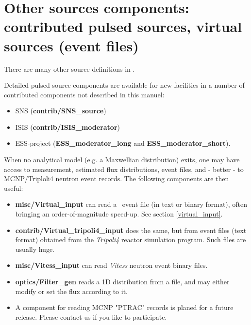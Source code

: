 \newpage


\newpage


\newpage


\newpage


\newpage


\newpage


\newpage


\newpage


\newpage
\section{Other sources components: contributed pulsed sources, virtual sources (event files)}
\label{sources-seealso}

There are many other source definitions in \MCS .

Detailed pulsed source components are available for new facilities
in a number of contributed components not described in this manuel:
\begin{itemize}
\item SNS ({\bf contrib/SNS\_source})
\item ISIS ({\bf contrib/ISIS\_moderator})
\item ESS-project ({\bf ESS\_moderator\_long} and {\bf  ESS\_moderator\_short}).
\end{itemize}

When no analytical model (e.g. a Maxwellian distribution) exits, 
one may have access to measurement, estimated flux distributions, 
event files, and - better - to MCNP/Triploli4 neutron event records. 
The following components are then useful:

\begin{itemize}
\item{{\bf misc/Virtual\_input} can read a \MCS\ event file 
(in text or binary format), often bringing an order-of-magnitude speed-up. 
See section \ref{virtual_input}.}
\item{{\bf contrib/Virtual\_tripoli4\_input} does the same, but from event files (text format) obtained from the \emph{Tripoli4} \cite{tripoli_webpage} reactor simulation program. Such files are usually huge.}
\item{{\bf misc/Vitess\_input} can read \emph{Vitess} \cite{vitess_webpage} neutron event binary files.}
\item{{\bf optics/Filter\_gen} reads a 1D distribution from a file, and may either modify or set the flux according to it.}
\item{A component for reading MCNP "PTRAC" records is planed for a future release. 
Please contact us if you like to participate.}
\end{itemize}
